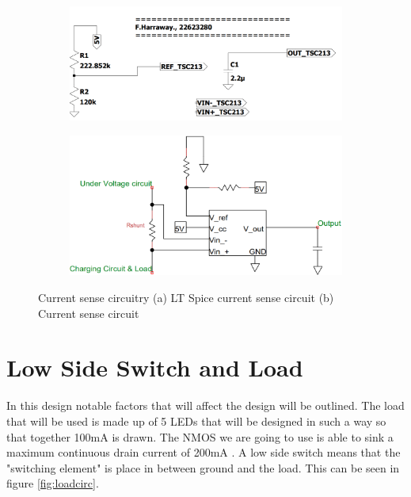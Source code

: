  \begin{figure}[!htb]
 \footnotesize
 \centering
    \begin{subfigure}[]{0.42\textwidth}
              \centering
  		\includegraphics[width=1\linewidth]{./Figures/A4circ}
		    \caption{} \label{fig:A4circ}
     \end{subfigure}
     \begin{subfigure}[]{0.5\textwidth}
             \centering
  		\includegraphics[width=1\linewidth]{./Figures/currentSense}
		   \caption{ } \label{subfig:c-s}
     \end{subfigure}
   \caption[{Fuse Characteristics}]{Current sense circuitry   (a) LT Spice current sense circuit (b)  Current sense circuit }
    \label{fig:C-S}
 \end{figure}




\newpage
\section{Low Side Switch and Load}
\label{sec:loswide}
\label{sec:loadcontrol_lit}
In this design notable factors that will affect the design will be outlined. The load that will be used is made up of 5 LEDs that will be designed in such a way so that together 100mA is drawn. The NMOS we are going to use is able to sink a maximum continuous drain current of 200mA \cite{NData}. A low side switch means that the "switching element" is place in between ground and the load. This can be seen in figure \ref{fig:loadcirc}.

